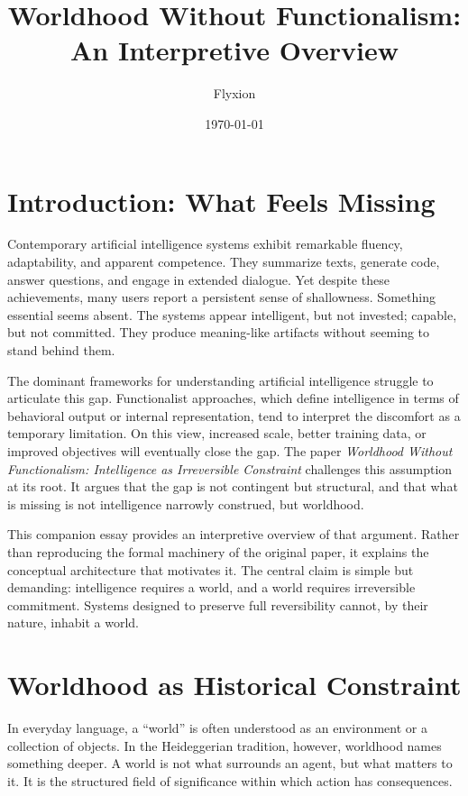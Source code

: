 \documentclass[11pt]{article}
\title{Worldhood Without Functionalism:\\
An Interpretive Overview}
\author{Flyxion}
\date{\today}
\begin{document}
\maketitle

\section{Introduction: What Feels Missing}

Contemporary artificial intelligence systems exhibit remarkable fluency, adaptability, and apparent competence. They summarize texts, generate code, answer questions, and engage in extended dialogue. Yet despite these achievements, many users report a persistent sense of shallowness. Something essential seems absent. The systems appear intelligent, but not invested; capable, but not committed. They produce meaning-like artifacts without seeming to stand behind them.

The dominant frameworks for understanding artificial intelligence struggle to articulate this gap. Functionalist approaches, which define intelligence in terms of behavioral output or internal representation, tend to interpret the discomfort as a temporary limitation. On this view, increased scale, better training data, or improved objectives will eventually close the gap. The paper \textit{Worldhood Without Functionalism: Intelligence as Irreversible Constraint} challenges this assumption at its root. It argues that the gap is not contingent but structural, and that what is missing is not intelligence narrowly construed, but worldhood.

This companion essay provides an interpretive overview of that argument. Rather than reproducing the formal machinery of the original paper, it explains the conceptual architecture that motivates it. The central claim is simple but demanding: intelligence requires a world, and a world requires irreversible commitment. Systems designed to preserve full reversibility cannot, by their nature, inhabit a world.

\section{Worldhood as Historical Constraint}

In everyday language, a \enquote{world} is often understood as an environment or a collection of objects. In the Heideggerian tradition, however, worldhood names something deeper. A world is not what surrounds an agent, but what matters to it. It is the structured field of significance within which action has consequences.
\end{document}
